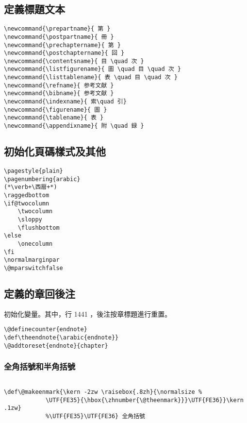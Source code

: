 \subsection{定義標題文本}

\begin{lstlisting}[firstnumber=1411]
\newcommand{\prepartname}{ 第 }
\newcommand{\postpartname}{ 冊 }
\newcommand{\prechaptername}{ 第 }
\newcommand{\postchaptername}{ 回 }
\newcommand{\contentsname}{ 目 \quad 次 }
\newcommand{\listfigurename}{ 圖 \quad 目 \quad 次 }
\newcommand{\listtablename}{ 表 \quad 目 \quad 次 }
\newcommand{\refname}{ 参考文献 }
\newcommand{\bibname}{ 参考文献 }
\newcommand{\indexname}{ 索\quad 引}
\newcommand{\figurename}{ 圖 }
\newcommand{\tablename}{ 表 }
\newcommand{\appendixname}{ 附 \quad 録 }
\end{lstlisting}

\subsection{初始化頁碼樣式及其他}

\begin{lstlisting}[firstnumber=1424]
\pagestyle{plain}
\pagenumbering{arabic}
(*\verb+\西暦+*)
\raggedbottom
\if@twocolumn
	\twocolumn
	\sloppy
	\flushbottom
\else
	\onecolumn
\fi
\normalmarginpar
\@mparswitchfalse
\end{lstlisting}


\subsection{定義的章回後注}

\par 初始化變量。其中，行 1441 ，後注按章標題進行重置。
\begin{lstlisting}[firstnumber=1439]
\@definecounter{endnote}
\def\theendnote{\arabic{endnote}}
\@addtoreset{endnote}{chapter}
\end{lstlisting}



\subsubsection{全角括號和半角括號}

\begin{lstlisting}[firstnumber=1443]
%\def\@makeenmark{\kern -1.2zw \raisebox{.8zh}{\tiny （{\hbox{\yoko\expandafter\ajTsumesuji\expandafter*\expandafter{\number\@theenmark}}}）}}

\def\@makeenmark{\kern -2zw \raisebox{.8zh}{\normalsize %
			\UTF{FE35}{\hbox{\zhnumber{\@theenmark}}}\UTF{FE36}}\kern .1zw}
			%\UTF{FE35}\UTF{FE36} 全角括號
\end{lstlisting}



